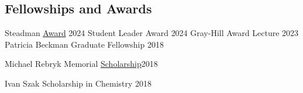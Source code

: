 \documentclass[margin,line]{res}
\newenvironment{list1}{
  \begin{list}{\ding{113}}{%
      \setlength{\itemsep}{0in}
      \setlength{\parsep}{0in} \setlength{\parskip}{0in}
      \setlength{\topsep}{0in} \setlength{\partopsep}{0in} 
      \setlength{\leftmargin}{0.17in}}}{\end{list}}
\newenvironment{list2}{
  \begin{list}{$\bullet$}{%
      \setlength{\itemsep}{0in}
      \setlength{\parsep}{0in} \setlength{\parskip}{0in}
      \setlength{\topsep}{0in} \setlength{\partopsep}{0in} 
      \setlength{\leftmargin}{0.2in}}}{\end{list}}
\begin{document}
\begin{resume}

%






\section{\sc Fellowships  \newline and Awards}
Steadman \href{https://www.rochester.edu/college/gradstudies/postdocs/steadman-awards.html}{Award} \hfill{2024}
\vspace*{-2mm}
Student Leader Award \hfill {2024}
\vspace*{-2mm}
Gray-Hill Award Lecture \hfill{2023}
\vspace*{-2mm}
Patricia Beckman Graduate Fellowship \hfill {2018}
\vspace*{-2mm}

Michael Rebryk Memorial  \href{http://ucu-building-community.blogspot.ca/2016/03/ucu-adds-new-scholarships-in-2016.html}{Scholarship}\hfill {2018}

\vspace*{-2mm}

Ivan Szak Scholarship in Chemistry \hfill {2018}

\vspace*{-2mm}


\end{resume}
\end{document}
